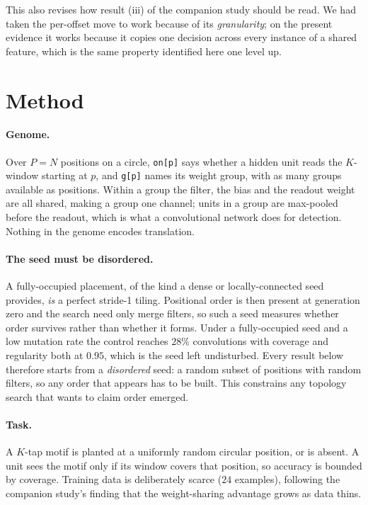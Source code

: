 \documentclass[11pt]{article}
\begin{document}
This also revises how result (iii) of the companion study should be read. We had taken the per-offset
move to work because of its \emph{granularity}; on the present evidence it works because it copies one
decision across every instance of a shared feature, which is the same property identified here one level
up.

\section{Method}

\paragraph{Genome.} Over $P = N$ positions on a circle, \texttt{on[p]} says whether a hidden unit reads
the $K$-window starting at $p$, and \texttt{g[p]} names its weight group, with as many groups available
as positions. Within a group the filter, the bias and the readout weight are all shared, making a group
one channel; units in a group are max-pooled before the readout, which is what a convolutional network
does for detection. Nothing in the genome encodes translation.

\paragraph{The seed must be disordered.} A fully-occupied placement, of the kind a dense or
locally-connected seed provides, \emph{is} a perfect stride-1 tiling. Positional order is then present at
generation zero and the search need only merge filters, so such a seed measures whether order survives
rather than whether it forms. Under a fully-occupied seed and a low mutation rate the control reaches
$28\%$ convolutions with coverage and regularity both at $0.95$, which is the seed left undisturbed.
Every result below therefore starts from a \emph{disordered} seed: a random subset of positions with
random filters, so any order that appears has to be built. This constrains any topology search that
wants to claim order emerged.

\paragraph{Task.} A $K$-tap motif is planted at a uniformly random circular position, or is absent. A
unit sees the motif only if its window covers that position, so accuracy is bounded by coverage.
Training data is deliberately scarce ($24$ examples), following the companion study's finding that the
weight-sharing advantage grows as data thins.
\end{document}

